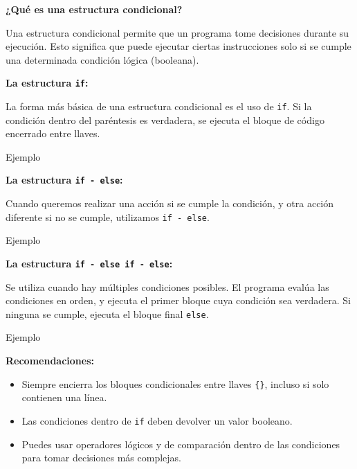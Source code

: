 \documentclass{article}
\newcommand{\cppfile}[2][]{
    \begin{container}{\faCode \space \space  #1}
        
    \end{container}
}
\begin{document}
\textbf{¿Qué es una estructura condicional?}

Una estructura condicional permite que un programa tome decisiones durante su ejecución. Esto significa que puede ejecutar ciertas instrucciones solo si se cumple una determinada condición lógica (booleana).

\vspace{0.5em}
\textbf{La estructura \texttt{if}:}

La forma más básica de una estructura condicional es el uso de \texttt{if}. Si la condición dentro del paréntesis es verdadera, se ejecuta el bloque de código encerrado entre llaves.

\cppfile[Ejemplo]{codes/condicional_if.cpp}

\vspace{0.5em}
\textbf{La estructura \texttt{if - else}:}

Cuando queremos realizar una acción si se cumple la condición, y otra acción diferente si no se cumple, utilizamos \texttt{if - else}.

\cppfile[Ejemplo]{codes/condicional_if_else.cpp}

\vspace{0.5em}
\textbf{La estructura \texttt{if - else if - else}:}

Se utiliza cuando hay múltiples condiciones posibles. El programa evalúa las condiciones en orden, y ejecuta el primer bloque cuya condición sea verdadera. Si ninguna se cumple, ejecuta el bloque final \texttt{else}.

\cppfile[Ejemplo]{codes/condicional_if_elseif_else.cpp}

\vspace{0.5em}
\textbf{Recomendaciones:}
\begin{itemize}
    \item Siempre encierra los bloques condicionales entre llaves \texttt{\{\}}, incluso si solo contienen una línea.
    \item Las condiciones dentro de \texttt{if} deben devolver un valor booleano.
    \item Puedes usar operadores lógicos y de comparación dentro de las condiciones para tomar decisiones más complejas.
\end{itemize}
\end{document}
